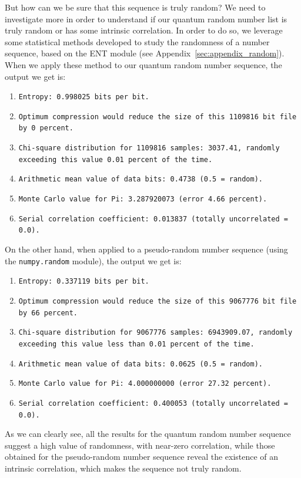 \documentclass[prl,twocolumn]{revtex4-1}
\begin{document}
But how can we be sure that this sequence is truly random? We need to investigate more in order to understand if our quantum random number list is truly random or has some intrinsic correlation. In order to do so, we leverage some statistical methods developed to study the randomness of a number sequence, based on the ENT module (see Appendix~\ref{sec:appendix_random}). When we apply these method to our quantum random number sequence, the output we get is:

\begin{enumerate}
    \item \texttt{Entropy: 0.998025 bits per bit.}
    \item \texttt{Optimum compression would reduce the size of this 1109816 bit file by 0 percent.}
    \item \texttt{Chi-square distribution for 1109816 samples: 3037.41, randomly exceeding this value 0.01 percent of the time.}
    \item \texttt{Arithmetic mean value of data bits: 0.4738 (0.5 = random).}
    \item \texttt{Monte Carlo value for Pi: 3.287920073 (error 4.66 percent).}
    \item \texttt{Serial correlation coefficient: 0.013837 (totally uncorrelated = 0.0).}
\end{enumerate}

On the other hand, when applied to a pseudo-random number sequence (using the \texttt{numpy.random} module), the output we get is:
\begin{enumerate}
    \item \texttt{Entropy: 0.337119 bits per bit.}
    \item \texttt{Optimum compression would reduce the size of this 9067776 bit file by 66 percent.}
    \item \texttt{Chi-square distribution for 9067776 samples: 6943909.07, randomly exceeding this value less than 0.01 percent of the time.}
    \item \texttt{Arithmetic mean value of data bits: 0.0625 (0.5 = random).}
    \item \texttt{Monte Carlo value for Pi: 4.000000000 (error 27.32 percent).}
    \item \texttt{Serial correlation coefficient: 0.400053 (totally uncorrelated = 0.0).}
\end{enumerate}

As we can clearly see, all the results for the quantum random number sequence suggest a high value of randomness, with near-zero correlation, while those obtained for the pseudo-random number sequence reveal the existence of an intrinsic correlation, which makes the sequence not truly random.
\end{document}
